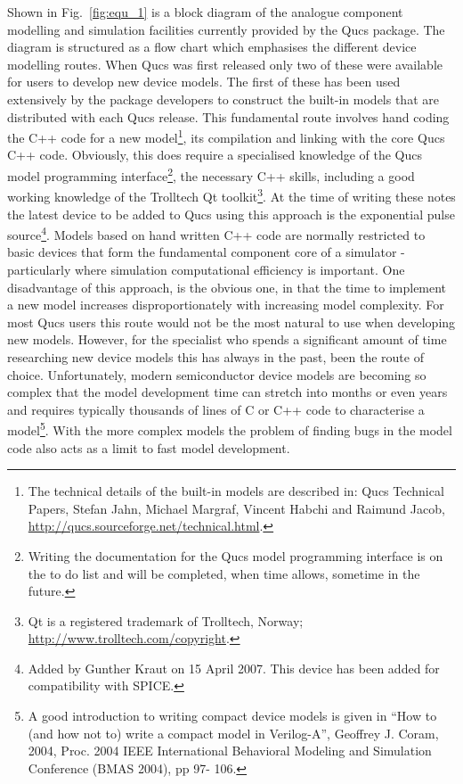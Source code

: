 \vspace{5mm}
Shown in Fig.~\ref{fig:equ_1} is a block diagram of the analogue
component modelling and simulation facilities currently provided by
the Qucs package.  The diagram is structured as a flow chart which
emphasises the different device modelling routes.  When Qucs was first
released only two of these were available for users to develop new
device models.  The first of these has been used extensively by the
package developers to construct the built-in models that are
distributed with each Qucs release.  This fundamental route involves
hand coding the C++ code for a new model\footnote{The technical
details of the built-in models are described in: Qucs Technical
Papers, Stefan Jahn, Michael Margraf, Vincent Habchi and Raimund
Jacob, \url{http://qucs.sourceforge.net/technical.html}.}, its
compilation and linking with the core Qucs C++ code. Obviously, this
does require a specialised knowledge of the Qucs model programming
interface\footnote{Writing the documentation for the Qucs model
programming interface is on the to do list and will be completed, when
time allows, sometime in the future.}, the necessary C++ skills,
including a good working knowledge of the Trolltech Qt
toolkit\footnote{Qt is a registered trademark of Trolltech, Norway;
\url{http://www.trolltech.com/copyright}.}. At the time of writing these
notes the latest device to be added to Qucs using this approach is the
exponential pulse source\footnote{Added by Gunther Kraut on 15 April
2007. This device has been added for compatibility with
SPICE.}. Models based on hand written C++ code are normally restricted
to basic devices that form the fundamental component core of a
simulator - particularly where simulation computational efficiency is
important.  One disadvantage of this approach, is the obvious one, in
that the time to implement a new model increases disproportionately
with increasing model complexity.  For most Qucs users this route
would not be the most natural to use when developing new models.
However, for the specialist who spends a significant amount of time
researching new device models this has always in the past, been the
route of choice.  Unfortunately, modern semiconductor device models
are becoming so complex that the model development time can stretch
into months or even years and requires typically thousands of lines of
C or C++ code to characterise a model\footnote{A good introduction to
writing compact device models is given in ``How to (and how not to)
write a compact model in Verilog-A'', Geoffrey J. Coram, 2004,
Proc. 2004 IEEE International Behavioral Modeling and Simulation
Conference (BMAS 2004), pp 97- 106.}.  With the more complex models
the problem of finding bugs in the model code also acts as a limit to
fast model development.


